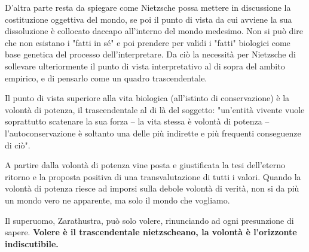 D'altra parte resta da spiegare come Nietzsche possa mettere in discussione la costituzione oggettiva del mondo, se poi il punto di vista da cui avviene la sua dissoluzione è collocato daccapo all'interno del mondo medesimo. Non si può dire che non esistano i "fatti in sé" e poi prendere per validi i "fatti" biologici come base genetica del processo dell'interpretare. Da ciò la necessità per Nietzsche di sollevare  ulteriormente il punto di vista interpretativo al di sopra del ambito empirico, e di pensarlo come un quadro trascendentale.

Il punto di vista superiore alla vita biologica (all'istinto di conservazione) è la volontà di potenza, il trascendentale al di là del soggetto: "un'entità vivente vuole soprattutto scatenare la sua forza -- la vita stessa è volontà di potenza -- l'autoconservazione è soltanto una delle più indirette e più frequenti conseguenze di ciò".

A partire dalla volontà di potenza vine posta e giustificata la tesi dell'eterno ritorno e la proposta positiva di una transvalutazione di tutti i valori. Quando la volontà di potenza riesce ad imporsi sulla debole volontà di verità, non si da più un mondo vero ne apparente, ma solo il mondo che vogliamo.

Il superuomo, Zarathustra, può solo volere, rinunciando ad ogni presunzione di  sapere. \textbf{Volere è il trascendentale nietzscheano, la volontà è l'orizzonte indiscutibile.}


























